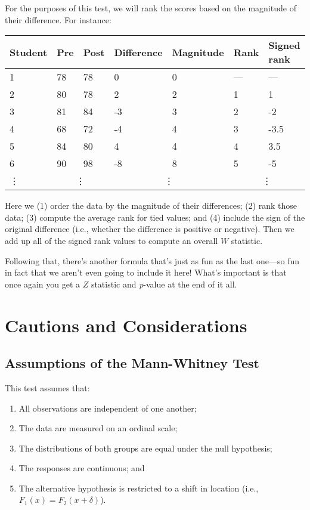 For the purposes of this test, we will rank the scores based on the magnitude of their difference. For instance:

\begin{tabular}{l l l | l l l l}
Student & Pre & Post & Difference & Magnitude & Rank & Signed rank \\
\hline
1 & 78 & 78 & 0 & 0 & --- & --- \\
2 & 80 & 78 & 2 & 2 & 1 & 1 \\
3 & 81 & 84 & -3 & 3 & 2 & -2 \\
4 & 68 & 72 & -4 & 4 & 3 & -3.5 \\
5 & 84 & 80 & 4 & 4 & 4 & 3.5 \\
6 & 90 & 98 & -8 & 8 & 5 & -5 \\
\vdots & \multicolumn{2}{c}{\vdots} & \multicolumn{2}{c}{\vdots} & \multicolumn{2}{c}{\vdots} \\
\end{tabular}

Here we (1) order the data by the magnitude of their differences; (2) rank those data; (3) compute the average rank for tied values; and (4) include the sign of the original difference (i.e., whether the difference is positive or negative). Then we add up all of the signed rank values  to compute  an  overall  $W$  statistic.

Following  that,  there's  another  formula that's  just  as  fun  as the  last  one---so  fun in fact that we aren't even going to include  it here!  What's important  is that once again you get a $Z$ statistic and \textit{p}-value at the  end of  it  all.

\section{Cautions and Considerations}

\subsection{Assumptions of the Mann-Whitney Test}

This test assumes that:
\begin{enumerate}
\item All observations are independent of one another;
\item The data are measured on an ordinal scale;
\item The distributions of both groups are equal under the null hypothesis;
\item The responses are continuous; and
\item The alternative hypothesis is restricted to a shift in location (i.e., $F_1(x)=F_2(x+\delta)$).
\end{enumerate}

